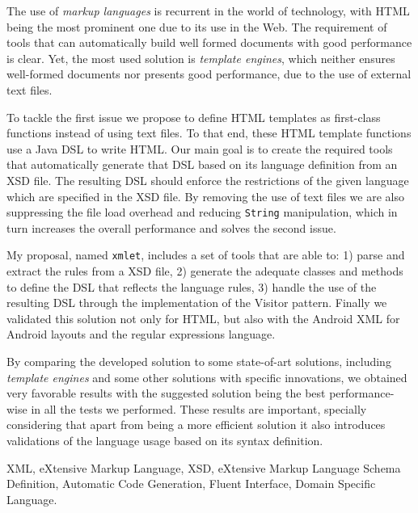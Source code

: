 \abstractEN %

The use of \textit{markup languages} is recurrent in the world of technology, with \ac{HTML} being the most prominent one due to its use in the Web. The requirement of tools that can automatically build well formed documents with good performance is clear. Yet, the most used solution is \textit{template engines}, which neither ensures well-formed documents nor presents good performance, due to the use of external text files.

\noindent
To tackle the first issue we propose to define \ac{HTML} templates as first-class functions instead of using text files. To that end, these \ac{HTML} template functions use a Java \ac{DSL} to write \ac{HTML}. Our main goal is to create the required tools that automatically generate that \ac{DSL} based on its language definition from an \ac{XSD} file. The resulting \ac{DSL} should enforce the restrictions of the given language which are specified in the \ac{XSD} file. By removing the use of text files we are also suppressing the file load overhead and reducing \texttt{String} manipulation, which in turn increases the overall performance and solves the second issue.

\noindent
My proposal, named \texttt{xmlet}, includes a set of tools that are able to: 1) parse and extract the rules from a \ac{XSD} file, 2) generate the adequate classes and methods to define the \ac{DSL} that reflects the language rules, 3) handle the use of the resulting \ac{DSL} through the implementation of the Visitor pattern. Finally we validated this solution not only for \ac{HTML}, but also with the Android \ac{XML} for Android layouts and the regular expressions language.

\noindent
By comparing the developed solution to some state-of-art solutions, including \textit{template engines} and some other solutions with specific innovations, we obtained very favorable results with the suggested solution being the best performance-wise in all the tests we performed. These results are important, specially considering that apart from being a more efficient solution it also introduces validations of the language usage based on its syntax definition.

\begin{keywords}
XML, eXtensive Markup Language, XSD, eXtensive Markup Language Schema Definition, Automatic Code Generation, Fluent Interface, Domain Specific Language.
\end{keywords} 
